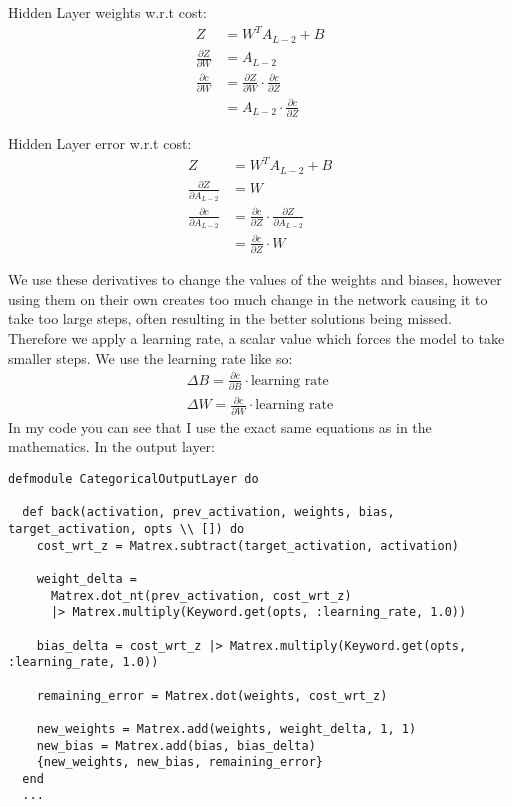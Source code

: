 Hidden Layer weights w.r.t cost:
\begin{equation}
    \begin{aligned}
        Z &= W^{T}A_{L-2} + B\\
        \frac{\partial Z}{\partial W} &= A_{L-2}\\[2em]
        \frac{\partial c}{\partial W} &= \frac{\partial Z}{\partial W} \cdot \frac{\partial c}{\partial Z}\\
                                      &= A_{L-2} \cdot \frac{\partial c}{\partial Z}
    \end{aligned}
\end{equation}

Hidden Layer error w.r.t cost:
\begin{equation}
    \begin{aligned}
        Z &= W^{T}A_{L-2} + B\\
        \frac{\partial Z}{\partial A_{L-2}} &= W\\[2em]
        \frac{\partial c}{\partial A_{L-2}} &= \frac{\partial c}{\partial Z} \cdot \frac{\partial Z}{\partial A_{L-2}}\\
                                      &= \frac{\partial c}{\partial Z} \cdot W
    \end{aligned}
\end{equation}

We use these derivatives to change the values of the weights and biases, however
using them on their own creates too much change in the network causing it to
take too large steps, often resulting in the better solutions being missed.
Therefore we apply a learning rate, a scalar value which forces the model to take smaller steps.
We use the learning rate like so:
\begin{equation}
    \begin{aligned}
        \Delta B = \frac{\partial c}{\partial B} \cdot \text{learning rate}\\[1em]
        \Delta W = \frac{\partial c}{\partial W} \cdot \text{learning rate} 
    \end{aligned}
\end{equation}
\clearpage
In my code you can see that I use the exact same equations as in the mathematics.
In the output layer:
\begin{lstlisting}
defmodule CategoricalOutputLayer do

  def back(activation, prev_activation, weights, bias, target_activation, opts \\ []) do
    cost_wrt_z = Matrex.subtract(target_activation, activation)

    weight_delta =
      Matrex.dot_nt(prev_activation, cost_wrt_z)
      |> Matrex.multiply(Keyword.get(opts, :learning_rate, 1.0))

    bias_delta = cost_wrt_z |> Matrex.multiply(Keyword.get(opts, :learning_rate, 1.0))

    remaining_error = Matrex.dot(weights, cost_wrt_z)

    new_weights = Matrex.add(weights, weight_delta, 1, 1)
    new_bias = Matrex.add(bias, bias_delta)
    {new_weights, new_bias, remaining_error}
  end
  ...
\end{lstlisting}

